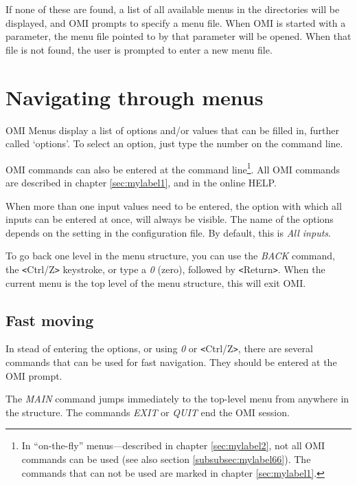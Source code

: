 \documentclass[a4paper]{book}
\newcommand{\vs}{\vspace{3mm}}
\newcommand{\lt}{\texttt{<}}
\newcommand{\gt}{\texttt{>}}
\begin{document}
If none of these are found, a list of all available menus in the directories 
will be displayed, and OMI prompts to specify a menu file. When OMI is 
started with a parameter, the menu file pointed to by that parameter will be 
opened. When that file is not found, the user is prompted to enter a new 
menu file.

\section{Navigating through menus}
\label{subsec:navigating}

OMI Menus display a list of options and/or values that can be filled in, 
further called `options'. To select an option, just type the number on the 
command line.

\vs

OMI commands can also be entered at the command line\footnote{ In 
``on-the-fly'' menus---described in chapter \ref{sec:mylabel2},
not all OMI commands can be used (see also section 
\ref{subsubsec:mylabel66}). The commands that can not be used are 
marked in chapter \ref{sec:mylabel1}.}. All OMI commands are 
described in chapter \ref{sec:mylabel1}, and in the online HELP.

\vs

When more than one input values need to be entered, the option with which all inputs can 
be entered at once, will always be visible. The name of the options depends 
on the setting in the configuration file. By default, this is \textsl{All inputs}.

\vs

To go back one level in the menu structure, you can use the \textsl{BACK} command, the \lt Ctrl/Z\gt{} keystroke, or type a \textsl{0} (zero), 
followed by \lt Return\gt . When the current menu is the top level of the menu 
structure, this will exit OMI.

\subsection{Fast moving}
\label{subsubsec:mylabel9}

In stead of entering the options, or using \textsl{0} or \lt Ctrl/Z\gt , there are 
several commands that can be used for fast navigation. They should be 
entered at the OMI prompt.

\vs

The \textsl{MAIN} command jumps immediately to the top-level 
menu from anywhere in the structure. The commands \textsl{EXIT} or \textsl{QUIT} end the OMI session.
\end{document}
